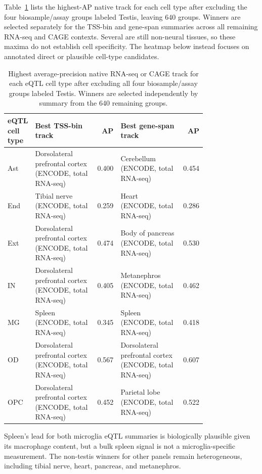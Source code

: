 \documentclass[11pt]{article}
\begin{document}
Table~\ref{tab:native_best_tracks} lists the highest-AP native track for each
cell type after excluding the four biosample/assay groups labeled Testis,
leaving 640 groups. Winners are selected separately for the TSS-bin and
gene-span summaries across all remaining RNA-seq and CAGE contexts. Several
are still non-neural tissues, so these maxima do not establish cell
specificity. The heatmap below instead focuses on annotated direct or
plausible cell-type candidates.

\begin{table}[ht]
\centering
\scriptsize
\caption{Highest average-precision native RNA-seq or CAGE track for each
eQTL cell type after excluding all four biosample/assay groups labeled
Testis. Winners are selected independently by summary from the 640 remaining
groups.}
\label{tab:native_best_tracks}
\begin{tabular}{@{}p{0.12\linewidth}p{0.33\linewidth}r p{0.33\linewidth}r@{}}
\toprule
eQTL cell type & Best TSS-bin track & AP & Best gene-span track & AP \\
\midrule
Ast & Dorsolateral prefrontal cortex (ENCODE, total RNA-seq) & 0.400 & Cerebellum (ENCODE, total RNA-seq) & 0.454 \\
End & Tibial nerve (ENCODE, total RNA-seq) & 0.259 & Heart (ENCODE, total RNA-seq) & 0.286 \\
Ext & Dorsolateral prefrontal cortex (ENCODE, total RNA-seq) & 0.474 & Body of pancreas (ENCODE, total RNA-seq) & 0.530 \\
IN & Dorsolateral prefrontal cortex (ENCODE, total RNA-seq) & 0.405 & Metanephros (ENCODE, total RNA-seq) & 0.462 \\
MG & Spleen (ENCODE, total RNA-seq) & 0.345 & Spleen (ENCODE, total RNA-seq) & 0.418 \\
OD & Dorsolateral prefrontal cortex (ENCODE, total RNA-seq) & 0.567 & Dorsolateral prefrontal cortex (ENCODE, total RNA-seq) & 0.607 \\
OPC & Dorsolateral prefrontal cortex (ENCODE, total RNA-seq) & 0.452 & Parietal lobe (ENCODE, total RNA-seq) & 0.522 \\
\bottomrule
\end{tabular}
\end{table}

Spleen's lead for both microglia eQTL summaries is biologically plausible given
its macrophage content, but a bulk spleen signal is not a microglia-specific
measurement. The non-testis winners for other panels remain heterogeneous,
including tibial nerve, heart, pancreas, and metanephros.
\end{document}
